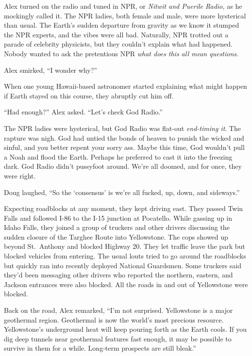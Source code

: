 Alex turned on the radio and tuned in NPR, or \emph{Nitwit and Puerile
Radio,} as he mockingly called it. The NPR ladies, both female and male,
were more hysterical than usual. The Earth's sudden departure from
gravity as we know it stumped the NPR experts, and the vibes were all
bad. Naturally, NPR trotted out a parade of celebrity physicists, but
they couldn't explain what had happened. Nobody wanted to ask the
pretentious NPR \emph{what does this all mean questions}.

Alex smirked, ``I wonder why?''

When one young Hawaii-based astronomer started explaining what might
happen if Earth stayed on this course, they abruptly cut him off.

``Had enough?'' Alex asked. ``Let's check God Radio.''

The NPR ladies were hysterical, but God Radio was flat-out
\emph{end-timing it}. The rapture was nigh. God had untied the bonds of
heaven to punish the wicked and sinful, and you better repent your sorry
ass. Maybe this time, God wouldn't pull a Noah and flood the Earth.
Perhaps he preferred to cast it into the freezing dark. God Radio didn't
pussyfoot around. We're all doomed, and for once, they were right.

Doug laughed, ``So the `consensus' is we're all fucked, up, down, and
sideways.''

Expecting roadblocks at any moment, they kept driving east. They passed
Twin Falls and followed I-86 to the I-15 junction at Pocatello. While
gassing up in Idaho Falls, they joined a group of truckers and other
drivers discussing the sudden closure of the Targhee Route into
Yellowstone. The cops showed up beyond St.~Anthony and blocked Highway
20. They let traffic leave the park but blocked vehicles from entering.
The usual louts tried to go around the roadblocks but quickly ran into
recently deployed National Guardsmen. Some truckers said they'd been
messaging other drivers who reported the northern, eastern, and Jackson
entrances were also blocked. All the roads in and out of Yellowstone
were blocked.

Back on the road, Alex remarked, ``I'm not surprised. Yellowstone is a
major geothermal region. Geothermal is now the world's most precious
resource. Yellowstone's underground heat will keep pouring forth as the
Earth cools. If you dig deep tunnels near geothermal features fast
enough, it may be possible to survive in them for a while. Long-term
prospects are still bleak.''

